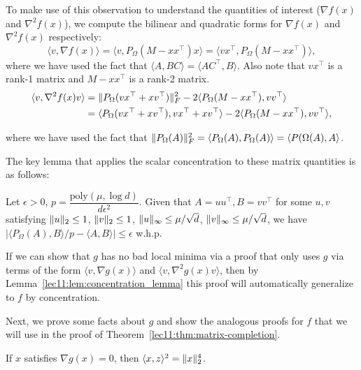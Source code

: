 To make use of this observation to understand the quantities of interest ($\nabla f(x)$ and $\nabla^2 f(x)$), we compute the bilinear and quadratic forms for $\nabla f(x)$ and $\nabla^2 f(x)$ respectively:
\begin{equation}
\langle v, \nabla f(x) \rangle = \langle v, P_\Omega(M-xx^\top)x \rangle = \langle vx^\top, P_\Omega(M-xx^\top) \rangle,
\end{equation}
where we have used the fact that $\langle A,BC \rangle = \langle AC^\top,B\rangle$. Also note that $vx^\top$ is a rank-1 matrix and $M-xx^\top$ is a rank-2 matrix.
\begin{align}
\langle v, \nabla^2 f(x) v \rangle &= \|P_\Omega(vx^\top + xv^\top)\|_F^2 - 2\langle P_\Omega(M-xx^\top), vv^\top \rangle \\
&=  \langle P_\Omega(vx^\top + xv^\top), vx^\top + xv^\top \rangle - 2\langle P_\Omega(M-xx^\top), vv^\top \rangle,
\end{align}

where we have used the fact that $\|P_\Omega(A)\|_F^2 = \langle P_\Omega(A), P_\Omega(A)\rangle = \langle P(\Omega(A), A\rangle$.

The key lemma that applies the scalar concentration to these matrix quantities is as follows:

\begin{lemma}
Let $\epsilon>0$, $p = \dfrac{\textrm{poly}(\mu, \log d)}{d\epsilon^2}$. Given that $A = uu^\top, B=vv^\top$ for some $u, v$ satisfying $\|u\|_2 \leq 1$, $\|v\|_2 \leq 1$, $\|u\|_\infty \leq \mu / \sqrt{d}$, $\|v\|_\infty \leq \mu / \sqrt{d}$, we have $|\langle P_\Omega(A), B \rangle/p - \langle A, B\rangle| \leq \epsilon$ w.h.p.
\label{lec11:lem:concentration_lemma}
\end{lemma}

If we can show that $g$ has no bad local minima via a proof that only uses $g$ via terms of the form $\langle v, \nabla g(x) \rangle$ and $\langle v, \nabla^2 g(x) v \rangle$, then by Lemma~\ref{lec11:lem:concentration_lemma} this proof will automatically generalize to $f$ by concentration.

Next, we prove some facts about $g$ and show the analogous proofs for $f$ that we will use in the proof of Theorem~\ref{lec11:thm:matrix-completion}.

\begin{lemma}\label{lec11:lem:inner-g}
If $x$ satisfies $\nabla g(x) = 0$, then $\langle x,z \rangle^2 = \|x\|_2^4$.
\end{lemma}

